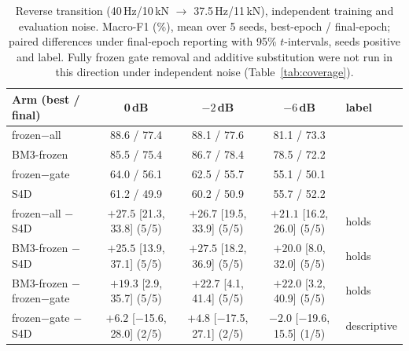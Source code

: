 \begin{table}[htbp]
\centering
\caption{Reverse transition (40\,Hz/10\,kN $\rightarrow$ 37.5\,Hz/11\,kN), independent training and evaluation noise. Macro-F1 (\%), mean over 5 seeds, best-epoch / final-epoch; paired differences under final-epoch reporting with 95\% $t$-intervals, seeds positive and label. Fully frozen gate removal and additive substitution were not run in this direction under independent noise (Table~\ref{tab:coverage}).}
\label{tab:reverse}
\footnotesize\setlength{\tabcolsep}{3pt}
\begin{tabular}{@{}lcccl@{}}
\toprule
Arm (best / final) & 0\,dB & $-2$\,dB & $-6$\,dB & label \\
\midrule
frozen$-$all & 88.6 / 77.4 & 88.1 / 77.6 & 81.1 / 73.3 \\
BM3-frozen & 85.5 / 75.4 & 86.7 / 78.4 & 78.5 / 72.2 \\
frozen$-$gate & 64.0 / 56.1 & 62.5 / 55.7 & 55.1 / 50.1 \\
S4D & 61.2 / 49.9 & 60.2 / 50.9 & 55.7 / 52.2 \\
\midrule
\shortstack[l]{frozen$-$all\\ $-$ S4D} & \shortstack{$+27.5$\\ {[}21.3, 33.8{]} (5/5)} & \shortstack{$+26.7$\\ {[}19.5, 33.9{]} (5/5)} & \shortstack{$+21.1$\\ {[}16.2, 26.0{]} (5/5)} & holds \\[3pt]
\shortstack[l]{BM3-frozen\\ $-$ S4D} & \shortstack{$+25.5$\\ {[}13.9, 37.1{]} (5/5)} & \shortstack{$+27.5$\\ {[}18.2, 36.9{]} (5/5)} & \shortstack{$+20.0$\\ {[}8.0, 32.0{]} (5/5)} & holds \\[3pt]
\shortstack[l]{BM3-frozen\\ $-$ frozen$-$gate} & \shortstack{$+19.3$\\ {[}2.9, 35.7{]} (5/5)} & \shortstack{$+22.7$\\ {[}4.1, 41.4{]} (5/5)} & \shortstack{$+22.0$\\ {[}3.2, 40.9{]} (5/5)} & holds \\[3pt]
\shortstack[l]{frozen$-$gate\\ $-$ S4D} & \shortstack{$+6.2$\\ {[}$-$15.6, 28.0{]} (2/5)} & \shortstack{$+4.8$\\ {[}$-$17.5, 27.1{]} (2/5)} & \shortstack{$-2.0$\\ {[}$-$19.6, 15.5{]} (1/5)} & descriptive \\[3pt]
\bottomrule
\end{tabular}
\end{table}

